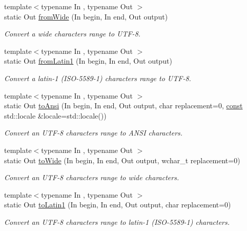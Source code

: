 \begin{DoxyCompactItemize}
{\footnotesize template$<$typename In , typename Out $>$ }\\static Out \hyperlink{classsf_1_1_utf_3_018_01_4_aa99e636a7addc157b425dfc11b008f42}{from\-Wide} (In begin, In end, Out output)
\begin{DoxyCompactList}\small\item\em Convert a wide characters range to U\-T\-F-\/8. \end{DoxyCompactList}\item 
{\footnotesize template$<$typename In , typename Out $>$ }\\static Out \hyperlink{classsf_1_1_utf_3_018_01_4_a85dd3643b7109a1a2f802747e55e28e8}{from\-Latin1} (In begin, In end, Out output)
\begin{DoxyCompactList}\small\item\em Convert a latin-\/1 (I\-S\-O-\/5589-\/1) characters range to U\-T\-F-\/8. \end{DoxyCompactList}\item 
{\footnotesize template$<$typename In , typename Out $>$ }\\static Out \hyperlink{classsf_1_1_utf_3_018_01_4_a3d8b02f29021bd48831e7706d826f0c5}{to\-Ansi} (In begin, In end, Out output, char replacement=0, \hyperlink{term__entry_8h_a57bd63ce7f9a353488880e3de6692d5a}{const} std\-::locale \&locale=std\-::locale())
\begin{DoxyCompactList}\small\item\em Convert an U\-T\-F-\/8 characters range to A\-N\-S\-I characters. \end{DoxyCompactList}\item 
{\footnotesize template$<$typename In , typename Out $>$ }\\static Out \hyperlink{classsf_1_1_utf_3_018_01_4_ac6633c64ff1fad6bd1bfe72c37b3a468}{to\-Wide} (In begin, In end, Out output, wchar\-\_\-t replacement=0)
\begin{DoxyCompactList}\small\item\em Convert an U\-T\-F-\/8 characters range to wide characters. \end{DoxyCompactList}\item 
{\footnotesize template$<$typename In , typename Out $>$ }\\static Out \hyperlink{classsf_1_1_utf_3_018_01_4_adf6f6e0a8ee0527c8ab390ce5c0b6b13}{to\-Latin1} (In begin, In end, Out output, char replacement=0)
\begin{DoxyCompactList}\small\item\em Convert an U\-T\-F-\/8 characters range to latin-\/1 (I\-S\-O-\/5589-\/1) characters. \end{DoxyCompactList}\item 

\end{DoxyCompactItemize}
